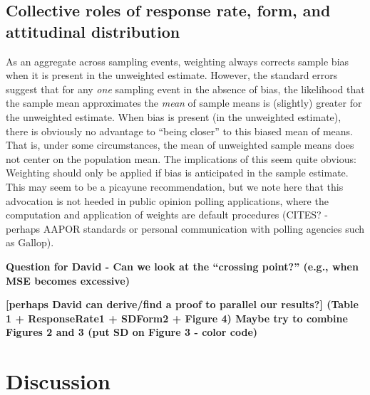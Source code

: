 \documentclass[
  man,mask]{apa7}
\begin{document}
\subsection{Collective roles of response rate, form, and attitudinal distribution}\label{collective-roles-of-response-rate-form-and-attitudinal-distribution}

As an aggregate across sampling events, weighting always corrects sample bias when it is present in the unweighted estimate. However, the standard errors suggest that for any \emph{one} sampling event in the absence of bias, the likelihood that the sample mean approximates the \emph{mean} of sample means is (slightly) greater for the unweighted estimate. When bias is present (in the unweighted estimate), there is obviously no advantage to ``being closer'' to this biased mean of means. That is, under some circumstances, the mean of unweighted sample means does not center on the population mean. The implications of this seem quite obvious: Weighting should only be applied if bias is anticipated in the sample estimate. This may seem to be a picayune recommendation, but we note here that this advocation is not heeded in public opinion polling applications, where the computation and application of weights are default procedures (CITES? - perhaps AAPOR standards or personal communication with polling agencies such as Gallop).

\textbf{Question for David - Can we look at the ``crossing point?'' (e.g., when MSE becomes excessive)}

\textbf{{[}perhaps David can derive/find a proof to parallel our results?{]} (Table 1 + ResponseRate1 + SDForm2 + Figure 4) Maybe try to combine Figures 2 and 3 (put SD on Figure 3 - color code)}

\section{Discussion}\label{discussion}
\end{document}
